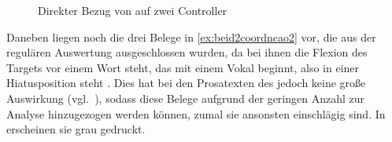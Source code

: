 \begin{figure}
\caption{Direkter Bezug von  auf zwei Controller}
\label{fig:beid2coordncao1_1}
\end{figure}

Daneben liegen noch die drei Belege in \cref{ex:beid2coordncao2} vor, die aus
der regulären Auswertung ausgeschlossen wurden, da bei ihnen die Flexion des
Targets vor einem Wort steht, das mit einem Vokal beginnt, also in einer
Hiatusposition steht \autocites[vgl.][90--91]{askedal1973}[191--193,
201]{gjelsten1980}. Dies hat bei den Prosatexten des \CAO{} jedoch
keine große Auswirkung (vgl.~), sodass diese Belege
aufgrund der geringen Anzahl zur Analyse hinzugezogen werden können, zumal sie
ansonsten einschlägig sind. In  erscheinen sie grau
gedruckt.

